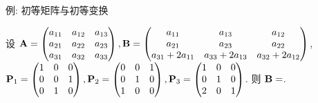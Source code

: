 \begin{frame}{例: 初等矩阵与初等变换}
	\onslide<+->
	\begin{example}
		设 ${\mathbf{A}}=\begin{pmatrix}
			a_{11}&a_{12}&a_{13}\\
			a_{21}&a_{22}&a_{23}\\
			a_{31}&a_{32}&a_{33}
		\end{pmatrix},{\mathbf{B}}=\begin{pmatrix}
			a_{11}&a_{13}&a_{12}\\
			a_{21}&a_{23}&a_{22}\\
			a_{31}+2a_{11}&a_{33}+2a_{13}&a_{32}+2a_{12}
		\end{pmatrix}$,\\
		${\mathbf{P}}_1=\begin{pmatrix}
			1&0&0\\0&0&1\\0&1&0
		\end{pmatrix},{\mathbf{P}}_2=\begin{pmatrix}
			0&0&1\\0&1&0\\1&0&0
		\end{pmatrix},{\mathbf{P}}_3=\begin{pmatrix}
			1&0&0\\0&1&0\\2&0&1
		\end{pmatrix}$.
		则 ${\mathbf{B}}=$.
	\end{example}
\end{frame}


